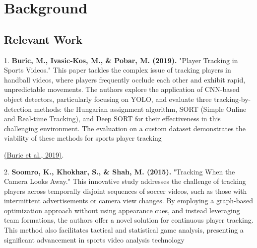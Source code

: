 \documentclass[12pt, letterpaper]{article}
\begin{document}
\section{Background}



{
\setlength{\parskip}{0.3cm}
\subsection{Relevant Work}
\begin{spacing}{1.2}
1. \textbf{Buric, M., Ivasic-Kos, M., \& Pobar, M. (2019).} "Player Tracking in Sports Videos."
This paper tackles the complex issue of tracking players in handball videos, where players frequently occlude each other and exhibit rapid, unpredictable movements. The authors explore the application of CNN-based object detectors, particularly focusing on YOLO, and evaluate three tracking-by-detection methods: the Hungarian assignment algorithm, SORT (Simple Online and Real-time Tracking), and Deep SORT for their effectiveness in this challenging environment. The evaluation on a custom dataset demonstrates the viability of these methods for sports player tracking 

\href{https://consensus.app/papers/player-tracking-sports-videos-buric/c3cd64da157a5e589e69d84d95373adb/?utm_source=chatgpt}{(Buric et al., 2019)}.

2. \textbf{Soomro, K., Khokhar, S., \& Shah, M. (2015).} "Tracking When the Camera Looks Away." 
This innovative study addresses the challenge of tracking players across temporally disjoint sequences of soccer videos, such as those with intermittent advertisements or camera view changes. By employing a graph-based optimization approach without using appearance cues, and instead leveraging team formations, the authors offer a novel solution for continuous player tracking. This method also facilitates tactical and statistical game analysis, presenting a significant advancement in sports video analysis technology


\end{spacing}}
\end{document}
